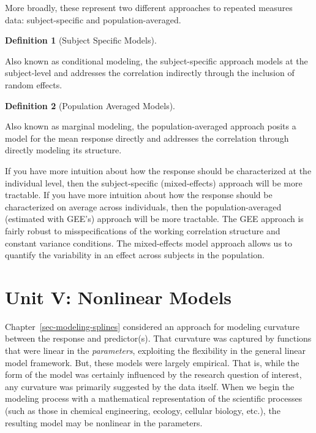 \documentclass[
  letterpaper,
  DIV=11,
  numbers=noendperiod]{scrreprt}
\theoremstyle{definition}
\newtheorem{definition}{Definition}[chapter]
\theoremstyle{definition}
\theoremstyle{remark}
\begin{document}
More broadly, these represent two different approaches to repeated
measures data: subject-specific and population-averaged.

\begin{definition}[Subject Specific
Models]\protect\hypertarget{def-subject-specific}{}\label{def-subject-specific}

Also known as conditional modeling, the subject-specific approach models
at the subject-level and addresses the correlation indirectly through
the inclusion of random effects.

\end{definition}

\begin{definition}[Population Averaged
Models]\protect\hypertarget{def-population-averaged}{}\label{def-population-averaged}

Also known as marginal modeling, the population-averaged approach posits
a model for the mean response directly and addresses the correlation
through directly modeling its structure.

\end{definition}

If you have more intuition about how the response should be
characterized at the individual level, then the subject-specific
(mixed-effects) approach will be more tractable. If you have more
intuition about how the response should be characterized on average
across individuals, then the population-averaged (estimated with GEE's)
approach will be more tractable. The GEE approach is fairly robust to
misspecifications of the working correlation structure and constant
variance conditions. The mixed-effects model approach allows us to
quantify the variability in an effect across subjects in the population.

\part{Unit V: Nonlinear Models}

Chapter~\ref{sec-modeling-splines} considered an approach for modeling
curvature between the response and predictor(s). That curvature was
captured by functions that were linear in the \emph{parameters},
exploiting the flexibility in the general linear model framework. But,
these models were largely empirical. That is, while the form of the
model was certainly influenced by the research question of interest, any
curvature was primarily suggested by the data itself. When we begin the
modeling process with a mathematical representation of the scientific
processes (such as those in chemical engineering, ecology, cellular
biology, etc.), the resulting model may be nonlinear in the parameters.
\end{document}
